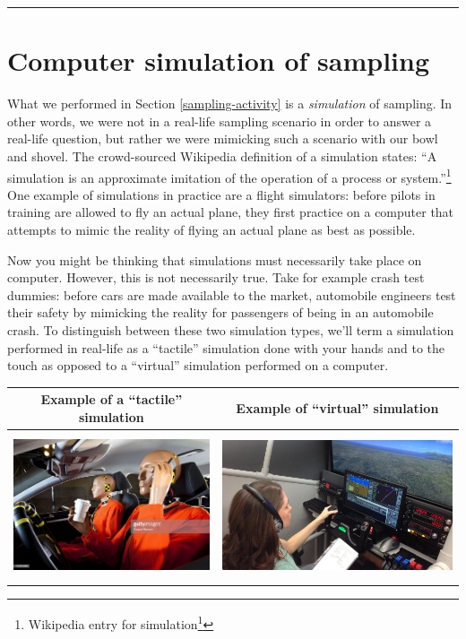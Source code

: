 \documentclass[12pt, krantz2,]{krantz}
\renewcommand{\href}[2]{#2\footnote{\url{#1}}}
\begin{document}
\begin{center}\rule{0.5\linewidth}{\linethickness}\end{center}

\hypertarget{sampling-simulation}{%
\section{Computer simulation of sampling}\label{sampling-simulation}}

What we performed in Section \ref{sampling-activity} is a \emph{simulation} of sampling. In other words, we were not in a real-life sampling scenario in order to answer a real-life question, but rather we were mimicking such a scenario with our bowl and shovel. The crowd-sourced Wikipedia definition of a simulation states: ``A simulation is an approximate imitation of the operation of a process or system.''\footnote{\href{https://en.wikipedia.org/wiki/Simulation}{Wikipedia entry for simulation}} One example of simulations in practice are a flight simulators: before pilots in training are allowed to fly an actual plane, they first practice on a computer that attempts to mimic the reality of flying an actual plane as best as possible.

Now you might be thinking that simulations must necessarily take place on computer. However, this is not necessarily true. Take for example crash test dummies: before cars are made available to the market, automobile engineers test their safety by mimicking the reality for passengers of being in an automobile crash. To distinguish between these two simulation types, we'll term a simulation performed in real-life as a ``tactile'' simulation done with your hands and to the touch as opposed to a ``virtual'' simulation performed on a computer.

\begin{longtable}[]{@{}cc@{}}
\toprule
Example of a ``tactile'' simulation & Example of ``virtual'' simulation\tabularnewline
\midrule
\endhead
\includegraphics[width=\textwidth,height=1.7in]{images/crash-test-dummy.jpg} & \includegraphics[width=\textwidth,height=1.7in]{images/flight-simulator.jpg}\tabularnewline
\bottomrule
\end{longtable}
\end{document}
